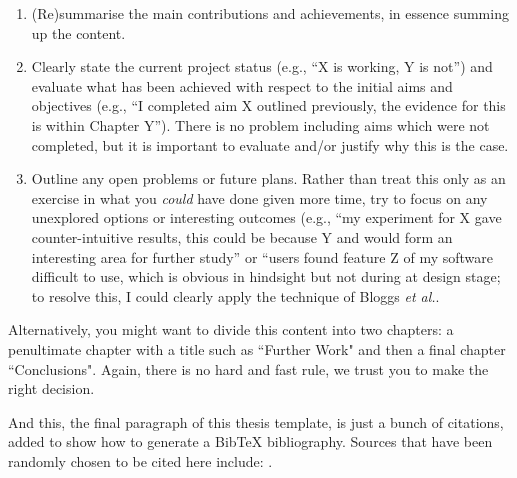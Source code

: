 \documentclass[ %
                    author={Daniel Page},
                supervisor={Dr. Andrew Calway},
                    degree={MSc},
                     title={Some Structural Guidelines for Data Science MSc Theses, Including Those With Long Titles that Run Across Multiple Lines on the Front Page},
                  subtitle={And those including an optional subtitle too, for good measure},
                      type={},
                      year={2021}]{dissertation}
\begin{document}
\begin{enumerate}
\item (Re)summarise the main contributions and achievements, in essence
      summing up the content.
\item Clearly state the current project status (e.g., ``X is working, Y 
      is not'') and evaluate what has been achieved with respect to the 
      initial aims and objectives (e.g., ``I completed aim X outlined 
      previously, the evidence for this is within Chapter Y'').  There 
      is no problem including aims which were not completed, but it is 
      important to evaluate and/or justify why this is the case.
\item Outline any open problems or future plans.  Rather than treat this
      only as an exercise in what you {\em could} have done given more 
      time, try to focus on any unexplored options or interesting outcomes
      (e.g., ``my experiment for X gave counter-intuitive results, this 
      could be because Y and would form an interesting area for further 
      study'' or ``users found feature Z of my software difficult to use,
      which is obvious in hindsight but not during at design stage; to 
      resolve this, I could clearly apply the technique of Bloggs {\em et al.}.
\end{enumerate}

Alternatively, you might want to divide this content into two chapters: a penultimate chapter with a title such as ``Further Work" and then a final chapter ``Conclusions". Again, there is no hard and fast rule, we trust you to make the right decision. 

And this, the final paragraph of this thesis template, is just a bunch of citations, added to show how to generate a BibTeX bibliography. Sources that have been randomly chosen to be cited here include:
\cite{miller_etal_2018_clojure,webber_marwan_2015,touretzky_2013_lisp,eckmann_etal_1987,marwan_2011,vach_2015,shiller_2017,vytelingum_2006,tesfatsion_2002,rust_etal_1992}.





%
%
\end{document}
